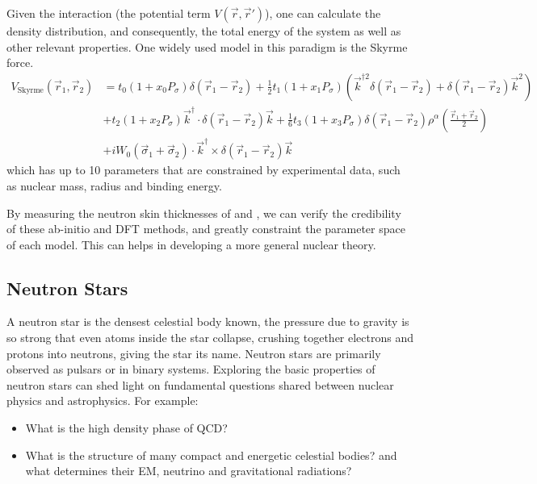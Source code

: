 Given the interaction (the potential term $V(\vec{r}, \vec{r}')$), 
one can calculate the density distribution, and consequently, the total 
energy of the system as well as other relevant properties. One widely used model
in this paradigm is the Skyrme force.
\begin{equation}
    \begin{aligned}
	V_{\text{Skyrme}}(\vec{r}_1, \vec{r}_2) &= t_0 (1 + x_0 P_\sigma)\delta(\vec{r}_1 - \vec{r}_2) 
	+ \frac{1}{2}t_1 (1 + x_1 P_\sigma) \left( \vec{k}^{\dag2}\delta(\vec{r}_1 - \vec{r}_2) + \delta(\vec{r}_1 - \vec{r}_2)\vec{k}^2 \right)    \\
	&+ t_2(1 + x_2 P_\sigma)\vec{k}^\dag \cdot \delta(\vec{r}_1 
	    - \vec{r}_2)\vec{k} + \frac{1}{6} t_3 (1 + x_3 P_\sigma)\delta(\vec{r}_1 - \vec{r}_2) \rho^\alpha\left( \frac{\vec{r}_1 + \vec{r}_2}{2} \right) \\
	&+ iW_0 (\vec{\sigma}_1 + \vec{\sigma}_2) \cdot \vec{k}^\dag \times \delta(\vec{r}_1 - \vec{r}_2) \vec{k}
    \end{aligned}
\end{equation}
which has up to 10 parameters that are constrained by experimental data, such as
nuclear mass, radius and binding energy.

\bigskip
By measuring the neutron skin thicknesses of \Pb and \Ca, we can verify the
credibility of these ab-initio and DFT methods, and greatly constraint the
parameter space of each model. This can helps in developing a more general nuclear theory.

\subsection{Neutron Stars}
A neutron star is the densest celestial body known, the pressure due to gravity is so strong
that even atoms inside the star collapse, crushing together electrons
and protons into neutrons, giving the star its name. Neutron stars are primarily
observed as pulsars or in binary systems. Exploring the basic properties of
neutron stars can shed light on fundamental questions shared between nuclear physics 
and astrophysics. For example:
\begin{itemize}
    \item What is the high density phase of QCD?
    \item What is the structure of many compact and energetic celestial bodies?
	and what determines their EM, neutrino and gravitational radiations?
\end{itemize}

